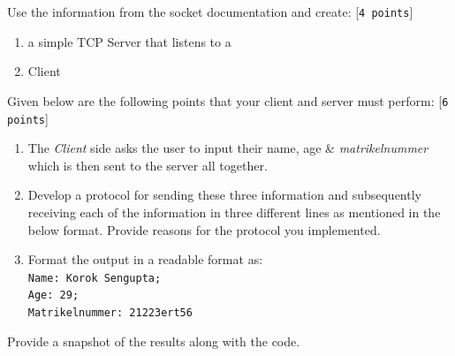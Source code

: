 \documentclass{scrartcl}
\begin{document}
Use the information from the socket documentation and create: [\texttt{4 points}]
\begin{enumerate}
\item a simple TCP Server that listens to a
\item Client
\end{enumerate}
Given below are the following points that your client and server must perform: [\texttt{6 points}]
\begin{enumerate}
\item The \emph{Client} side asks the user to input their name, age \& \emph{matrikelnummer} which is then sent to the server all together.
\item Develop a protocol for sending these three information and subsequently receiving each of the information in three different lines as mentioned in the below format. Provide reasons for the protocol you implemented. 
\item Format the output in a readable format as:\texttt{\\ Name: Korok Sengupta; \\ Age: 29; \\ Matrikelnummer: 21223ert56}
\end{enumerate}

Provide a snapshot of the results along with the code. \\
\end{document}
